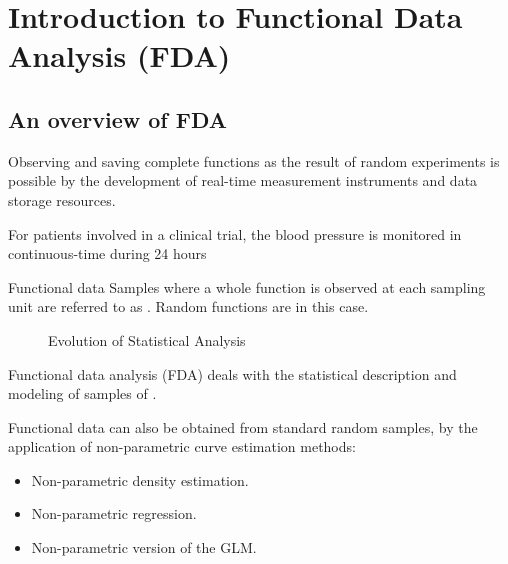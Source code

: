 \chapter{Introduction to Functional Data Analysis (FDA)}

\section{An overview of FDA}

Observing and saving complete functions as the result of random
experiments is possible by the development of real-time
measurement instruments and data storage resources.

\begin{example}{}{}
	For patients involved in a clinical trial, the blood pressure
	is monitored in continuous-time during 24 hours
\end{example}

\begin{definition}{Functional data}{}
	Samples where a whole function is observed at each sampling unit
	are referred to as .
	\tcblower
	Random functions are  in this case.
\end{definition}

\begin{figure}[H]
	\caption{Evolution of Statistical Analysis}
\end{figure}

Functional data analysis (FDA) deals with the statistical description
and modeling of samples of .

Functional data can also be obtained from standard random samples,
by the application of non-parametric curve estimation methods:
\begin{itemize}
	\item Non-parametric density estimation.
	\item Non-parametric regression.
	\item Non-parametric version of the GLM.
\end{itemize}

